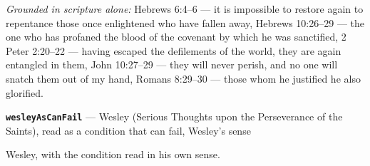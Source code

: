 \documentclass[11pt]{article}
\begin{document}
\emph{Grounded in scripture alone:} Hebrews 6:4–6 — it is impossible to restore again to repentance those once enlightened who have fallen away, Hebrews 10:26–29 — the one who has profaned the blood of the covenant by which he was sanctified, 2 Peter 2:20–22 — having escaped the defilements of the world, they are again entangled in them, John 10:27–29 — they will never perish, and no one will snatch them out of my hand, Romans 8:29–30 — those whom he justified he also glorified.
\par\medskip\noindent\textbf{\texttt{wesley\allowbreak{}As\allowbreak{}Can\allowbreak{}Fail}} --- Wesley (Serious Thoughts upon the Perseverance of the Saints), read as a condition that can fail, Wesley’s sense\par\nobreak\noindent
Wesley, with the condition read in his own sense.
\end{document}
